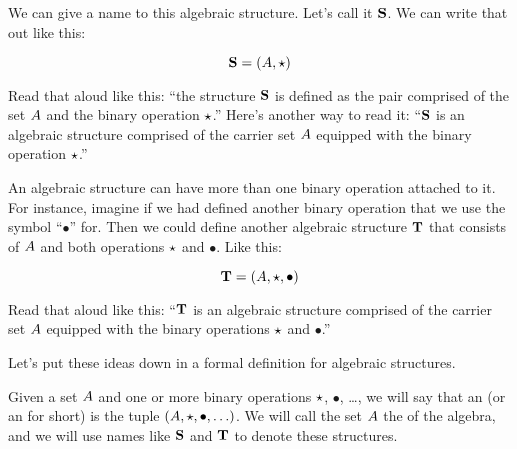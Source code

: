 \documentclass[../../../main.tex]{subfiles}
\begin{document}
We can give a name to this algebraic structure. Let's call it $\mathbf{S}$. We can write that out like this:

\begin{equation*}
  \struct{S} = (\set{A}, \opSymbol/)
\end{equation*}

Read that aloud like this: ``the structure $\mathbf{S}$ is defined as the pair comprised of the set $A$ and the binary operation $\opSymbol/$.'' Here's another way to read it: ``$\mathbf{S}$ is an algebraic structure comprised of the carrier set $A$ equipped with the binary operation $\opSymbol/$.''

An algebraic structure can have more than one binary operation attached to it. For instance, imagine if we had defined another binary operation that we use the symbol ``$\bullet$'' for. Then we could define another algebraic structure $\mathbf{T}$ that consists of $A$ and both operations $\opSymbol/$ and $\bullet$. Like this:

\begin{equation*}
  \struct{T} = (\set{A}, \opSymbol/, \bullet)
\end{equation*}

Read that aloud like this: ``$\mathbf{T}$ is an algebraic structure comprised of the carrier set $A$ equipped with the binary operations $\opSymbol/$ and $\bullet$.''

Let's put these ideas down in a formal definition for algebraic structures.

\begin{fdefinition}
  \label{def:algebraic-structure}
  Given a set $A$ and one or more binary operations $\opSymbol/$, $\bullet$, \ldots, we will say that an  (or an  for short) is the tuple $(\set{A}, \opSymbol/, \bullet, \ldots)$. We will call the set $A$ the  of the algebra, and we will use names like $\mathbf{S}$ and $\mathbf{T}$ to denote these structures.
\end{fdefinition}
\end{document}
